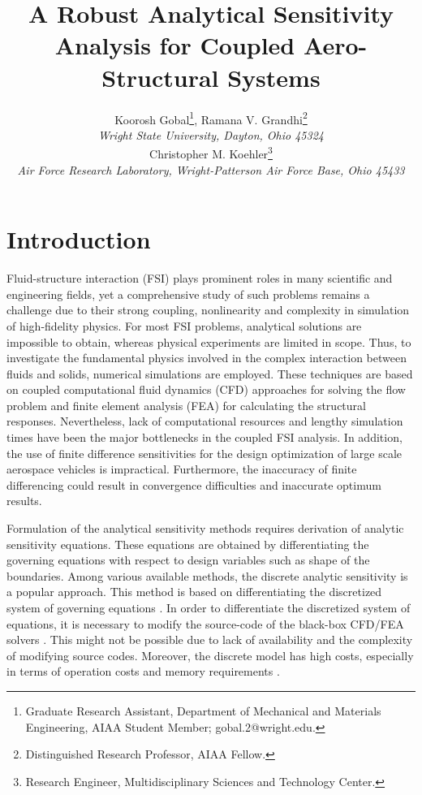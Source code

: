 \documentclass[12pt]{aiaa-pretty}
\author[Gobal, Kohler, and Grandhi]{ %
Koorosh Gobal\thanks{Graduate Research Assistant, Department of Mechanical and Materials Engineering, AIAA Student Member; gobal.2@wright.edu.},
Ramana V. Grandhi\thanks{Distinguished Research Professor, AIAA Fellow.}\\
\textit{Wright State University, Dayton, Ohio 45324}
\\
Christopher M. Koehler\thanks{Research Engineer, Multidisciplinary Sciences and Technology Center.}\\
\textit{Air Force Research Laboratory, Wright-Patterson Air Force Base, Ohio 45433}}
\title{A Robust Analytical Sensitivity Analysis for Coupled Aero-Structural Systems}
\begin{document}
\maketitle
\section{Introduction}
Fluid-structure interaction (FSI) plays prominent roles in many scientific and engineering fields, yet a comprehensive study of such problems remains a challenge due to their strong coupling, nonlinearity and complexity in simulation of high-fidelity physics. For most FSI problems, analytical solutions are impossible to obtain, whereas physical experiments are limited in scope. Thus, to investigate the fundamental physics involved in the complex interaction between fluids and solids, numerical simulations are employed. These techniques are based on coupled computational fluid dynamics (CFD) approaches for solving the flow problem and finite element analysis (FEA) for calculating the structural responses. Nevertheless, lack of computational resources and lengthy simulation times have been the major bottlenecks in the coupled FSI analysis. In addition, the use of finite difference sensitivities for the design optimization of large scale aerospace vehicles is impractical. Furthermore, the inaccuracy of finite differencing could result in convergence difficulties and inaccurate optimum results.

Formulation of the analytical sensitivity methods requires derivation of analytic sensitivity equations. These equations are obtained by differentiating the governing equations with respect to design variables such as shape of the boundaries. Among various available methods, the discrete analytic sensitivity is a popular approach. This method is based on differentiating the discretized system of governing equations \cite{martins2013review}. In order to differentiate the discretized system of equations, it is necessary to modify the source-code of the black-box CFD/FEA solvers \cite{cross2014local}. This might not be possible due to lack of availability and the complexity of modifying source codes. Moreover, the discrete model has high costs, especially in terms of operation costs and memory requirements \cite{peter2010numerical}.
\end{document}
